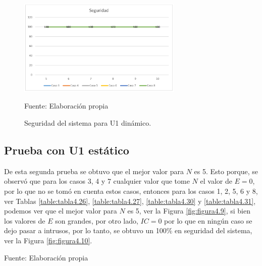 \begin{figure}[H]
\begin{center}
\includegraphics[width=0.7\textwidth]{Imagenes/Cap4/image008}
\end{center}
\begin{center}
\vskip -0.5cm
\caption{\small{Seguridad del sistema para U1 dinámico.}}
\label{fig:figura4.8}
{\small{Fuente: Elaboración propia}}
\end{center}
\end{figure}

\subsection{Prueba con U1 estático}
\par
De esta segunda prueba se obtuvo que el mejor valor para $N$ es 5. Esto porque, se observó que para los casos 3, 4 y 7 cualquier valor que tome $N$ el valor de $E = 0$, por lo que no se tomó en cuenta estos casos, entonces para los casos 1, 2, 5, 6 y 8, ver Tablas \ref{table:tabla4.26}, \ref{table:tabla4.27}, \ref{table:tabla4.30} y \ref{table:tabla4.31}, podemos ver que el mejor valor para $N$ es 5, ver la Figura \ref{fig:figura4.9}, si bien los valores de $E$ son grandes, por otro lado, $IC = 0$ por lo que en ningún caso se dejo pasar a intrusos, por lo tanto, se obtuvo un 100\% en seguridad del sistema, ver la Figura \ref{fig:figura4.10}.

\begin{center}
\begin{table}[H]
\centering
\caption{\small{Resultados para el caso 1 con U1 estático.}}
\label{table:tabla4.26}
\vskip 0.2cm
\begin{center}
\vskip 0.2cm
{\small{Fuente: Elaboración propia}}
\end{center}
\end{table}
\end{center}

